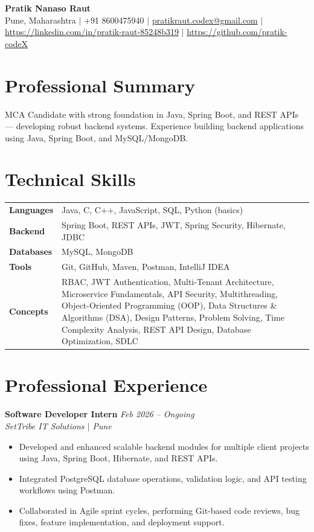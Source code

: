 \documentclass[10.5pt,a4paper]{article}
\begin{document}
\begin{center}
{\Large\bfseries Pratik Nanaso Raut}\\[2pt]
Pune, Maharashtra $|$ +91 8600475940 $|$ \href{mailto:pratikraut.codex@gmail.com}{pratikraut.codex@gmail.com} $|$ \href{https://linkedin.com/in/pratik-raut-85248b319}{https://linkedin.com/in/pratik-raut-85248b319} $|$ \href{https://github.com/pratik-codeX}{https://github.com/pratik-codeX}
\end{center}
\vspace{-2pt}
\section{Professional Summary}
MCA Candidate with strong foundation in Java, Spring Boot, and REST APIs — developing robust backend systems. Experience building backend applications using Java, Spring Boot, and MySQL/MongoDB.
\section{Technical Skills}
\begin{tabular}{@{}p{}p{}@{}}
\textbf{Languages} & Java, C, C++, JavaScript, SQL, Python (basics) \\[1pt]
\textbf{Backend} & Spring Boot, REST APIs, JWT, Spring Security, Hibernate, JDBC \\[1pt]
\textbf{Databases} & MySQL, MongoDB \\[1pt]
\textbf{Tools} & Git, GitHub, Maven, Postman, IntelliJ IDEA \\[1pt]
\textbf{Concepts} & RBAC, JWT Authentication, Multi-Tenant Architecture, Microservice Fundamentals, API Security, Multithreading, Object-Oriented Programming (OOP), Data Structures \& Algorithms (DSA), Design Patterns, Problem Solving, Time Complexity Analysis, REST API Design, Database Optimization, SDLC \\
\end{tabular}
\section{Professional Experience}
\textbf{Software Developer Intern} \hfill \textit{Feb 2026 -- Ongoing}
\\\textit{SetTribe IT Solutions $|$ Pune}
\begin{itemize}
  \item Developed and enhanced scalable backend modules for multiple client projects using Java, Spring Boot, Hibernate, and REST APIs.
  \item Integrated PostgreSQL database operations, validation logic, and API testing workflows using Postman.
  \item Collaborated in Agile sprint cycles, performing Git-based code reviews, bug fixes, feature implementation, and deployment support.
\end{itemize}
\end{document}
